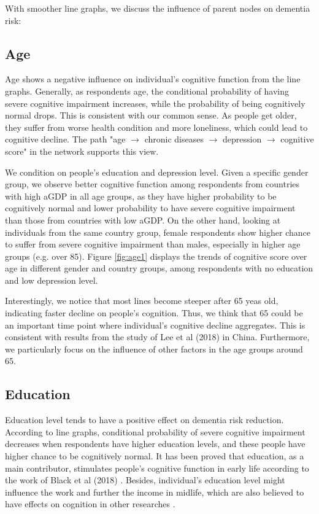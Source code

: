 \documentclass[11pt,twoside]{article}
\numberwithin{Theorem}{section}
\numberwithin{Definition}{section}
\numberwithin{Lemma}{section}
\numberwithin{Algorithm}{section}
\numberwithin{equation}{section}
\begin{document}
With smoother line graphs, we discuss the influence of parent nodes on dementia risk:

\subsection{Age}

Age shows a negative influence on individual's cognitive function from the line graphs. Generally, as respondents age, the conditional probability of having severe cognitive impairment increases, while the probability of being cognitively normal drops. This is consistent with our common sense. As people get older, they suffer from worse health condition and more loneliness, which could lead to cognitive decline. The path "age $\rightarrow$ chronic diseases $\rightarrow$ depression $\rightarrow$ cognitive score" in the network supports this view. 

We condition on people's education and depression level. Given a specific gender group, we observe better cognitive function among respondents from countries with high aGDP in all age groups, as they have higher probability to be cognitively normal and lower probability to have severe cognitive impairment than those from countries with low aGDP. On the other hand, looking at individuals from the same country group, female respondents show higher chance to suffer from severe cognitive impairment than males, especially in higher age groups (e.g. over 85). Figure \ref{fig:age1} displays the trends of cognitive score over age in different gender and country groups, among respondents with no education and low depression level.


Interestingly, we notice that most lines become steeper after 65 yeas old, indicating faster decline on people's cognition. Thus, we think that 65 could be an important time point where individual's cognitive decline aggregates. This is consistent with results from the study of Lee et al (2018) \cite{lee2018association} in China. Furthermore, we particularly focus on the influence of other factors in the age groups around 65.

\subsection {Education}

Education level tends to have a positive effect on dementia risk reduction. According to line graphs, conditional probability of severe cognitive impairment decreases when respondents have higher education levels, and these people have higher chance to be cognitively normal. It has been proved that education, as a main contributor, stimulates people's cognitive function in early life according to the work of Black et al (2018) \cite{blacker2018brain}. Besides, individual's education level might influence the work and further the income in midlife, which are also believed to have effects on cognition in other researches \cite{livingston2017dementia}.
\end{document}
